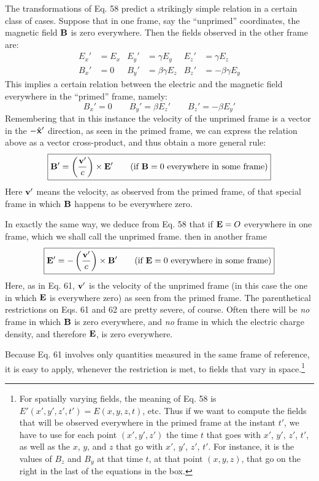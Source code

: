 The transformations of Eq. 58 predict a strikingly simple relation
in a certain class of cases. Suppose that in one frame, say the ``unprimed''
coordinates, the magnetic field $\mathbf{B}$ is zero everywhere. Then
the fields observed in the other frame are:
\begin{align}
    E_x'&=E_x   &   E_y'&=\gamma E_y         &   E_z'&=\gamma E_z \\
    B_x'&=0     &   B_y'&=\beta\gamma E_z    &   B_z'&=-\beta\gamma E_y
\end{align}
This implies a certain relation between the electric and the magnetic
field everywhere in the ``primed'' frame, namely:
\begin{equation}
  B_x'=0 \qquad B_y'=\beta E_z' \qquad B_z'=-\beta E_y'
\end{equation}
Remembering that in this instance the velocity of the unprimed frame
is a vector in the $-\hat{\mathbf{x}}'$ direction, as seen in the primed frame, we can
express the relation above as a vector cross-product, and thus obtain
a more general rule:
\begin{equation}
\boxed{
  \mathbf{B}' = \left(\frac{\mathbf{v}'}{c}\right) \times \mathbf{E}'
    \qquad (\text{if $\mathbf{B}=0$ everywhere in some frame})
}
\end{equation}
Here $\mathbf{v}'$ means the velocity, as observed from the primed frame, of
that special frame in which $\mathbf{B}$ happens to be everywhere zero.

In exactly the same way, we deduce from Eq. 58 that if $\mathbf{E} = O$
everywhere in one frame, which we shall call the unprimed frame.
then in another frame
\begin{equation}
\boxed{
  \mathbf{E}' = -\left(\frac{\mathbf{v}'}{c}\right) \times \mathbf{B}'
    \qquad (\text{if $\mathbf{E}=0$ everywhere in some frame})
}
\end{equation}
Here, as in Eq. 61, $\mathbf{v}'$ is the velocity of the unprimed frame (in this
case the one in which $\mathbf{E}$ is everywhere zero) as seen from the primed
frame. The parenthetical restrictions on Eqs. 61 and 62 are pretty
severe, of course. Often there will be \emph{no} frame in which $\mathbf{B}$ is zero
everywhere, and \emph{no} frame in which the electric charge density, and
therefore $\mathbf{E}$, is zero everywhere.

Because Eq. 61 involves only quantities measured in the same
frame of reference, it is easy to apply, whenever the restriction is
met, to fields that vary in 
space.\footnote{For spatially varying fields, the
meaning of Eq. 58 is $E'(x',y',z',t') = E(x,y,z,t)$, etc.
Thus if we want to compute the fields that will be observed everywhere in the primed
frame at the instant $t'$, we have to use for each point $(x',y',z')$ the time $t$ that goes with
$x'$, $y'$, $z'$, $t'$, as well as the $x$, $y$, and $z$ that
go with $x'$, $y'$, $z'$, $t'$. For instance, it is the
values of $B_z$ and $B_y$ at that time $t$, at that point $(x,y,z)$, that go on 
the right in the last of the equations in the box.}

